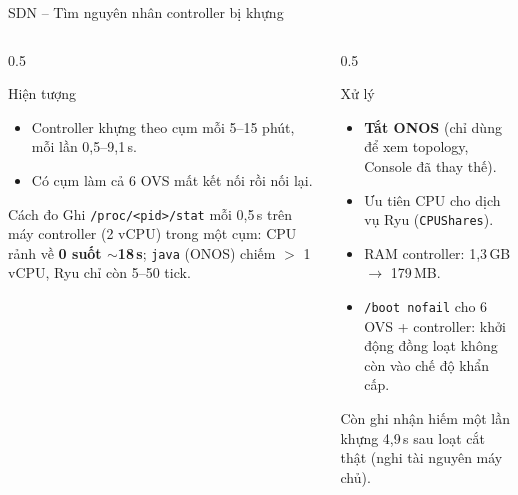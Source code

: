 \documentclass[aspectratio=169, 10pt]{beamer}
\begin{document}
\begin{frame}{SDN -- Tìm nguyên nhân controller bị khựng}
    \begin{columns}[T]
        \begin{column}{0.5\textwidth}
            \begin{alertblock}{Hiện tượng}
                \small
                \begin{itemize}
                    \item Controller khựng theo cụm mỗi 5--15 phút, mỗi lần 0,5--9,1\,s.
                    \item Có cụm làm cả 6 OVS mất kết nối rồi nối lại.
                \end{itemize}
            \end{alertblock}
            \begin{block}{Cách đo}
                \small
                Ghi \texttt{/proc/<pid>/stat} mỗi 0,5\,s trên máy controller (2 vCPU) trong một cụm:
                CPU rảnh về \textbf{0 suốt $\sim$18\,s}; \texttt{java} (ONOS) chiếm $>$ 1 vCPU, Ryu chỉ còn 5--50 tick.
            \end{block}
        \end{column}
        \begin{column}{0.5\textwidth}
            \begin{exampleblock}{Xử lý}
                \small
                \begin{itemize}
                    \item \textbf{Tắt ONOS} (chỉ dùng để xem topology, Console đã thay thế).
                    \item Ưu tiên CPU cho dịch vụ Ryu (\texttt{CPUShares}).
                    \item RAM controller: 1,3\,GB $\rightarrow$ 179\,MB.
                    \item \texttt{/boot nofail} cho 6 OVS + controller: khởi động đồng loạt không còn vào chế độ khẩn cấp.
                \end{itemize}
            \end{exampleblock}
            \vspace{0.1cm}
            \scriptsize Còn ghi nhận hiếm một lần khựng 4,9\,s sau loạt cắt thật (nghi tài nguyên máy chủ).
        \end{column}
    \end{columns}
\end{frame}
\end{document}
